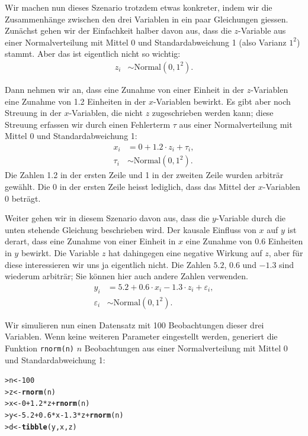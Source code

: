 \documentclass[oneside, 10pt]{book}\usepackage[]{graphicx}\usepackage[]{xcolor}
\makeatletter
\newcommand{\hlnum}[1]{\textcolor[rgb]{0.686,0.059,0.569}{#1}}%
\newcommand{\hlopt}[1]{\textcolor[rgb]{0,0,0}{#1}}%
\newcommand{\hlstd}[1]{\textcolor[rgb]{0.345,0.345,0.345}{#1}}%
\newcommand{\hlkwb}[1]{\textcolor[rgb]{0.69,0.353,0.396}{#1}}%
\newcommand{\hlkwd}[1]{\textcolor[rgb]{0.737,0.353,0.396}{\textbf{#1}}}%
\newenvironment{kframe}{%
 \def\at@end@of@kframe{}%
 \ifinner\ifhmode%
  \def\at@end@of@kframe{\end{minipage}}%
  \begin{minipage}{\columnwidth}%
 \fi\fi%
 \def\FrameCommand##1{\hskip\@totalleftmargin \hskip-\fboxsep
 \colorbox{shadecolor}{##1}\hskip-\fboxsep
     \hskip-\linewidth \hskip-\@totalleftmargin \hskip\columnwidth}%
 \MakeFramed {\advance\hsize-\width
   \@totalleftmargin\z@ \linewidth\hsize
   \@setminipage}}%
 {\par\unskip\endMakeFramed%
 \at@end@of@kframe}
\newenvironment{knitrout}{}{} %
\makeatother
\begin{document}
Wir machen nun dieses Szenario trotzdem etwas konkreter,
indem wir die Zusammenhänge zwischen den drei Variablen
in ein paar Gleichungen giessen.
Zunächst gehen wir der Einfachkeit halber davon aus,
dass die $z$-Variable aus einer Normalverteilung mit Mittel
0 und Standardabweichung 1 (also Varianz $1^2$) stammt.
Aber das ist eigentlich nicht so wichtig:
\begin{align}
z_i &\sim \textrm{Normal}(0, 1^2). \nonumber
\end{align}

Dann nehmen wir an, dass eine Zunahme von einer Einheit in der $z$-Variablen
eine Zunahme von 1.2 Einheiten in der $x$-Variablen bewirkt.
Es gibt aber noch Streuung in der $x$-Variablen, die nicht $z$ zugeschrieben
werden kann; diese Streuung erfassen wir durch einen Fehlerterm $\tau$
aus einer Normalverteilung mit Mittel 0 und Standardabweichung 1:
\begin{align}
x_i &= 0 + 1.2\cdot z_i + \tau_i, \label{eq:dag1_x} \\
\tau_i &\sim \textrm{Normal}(0, 1^2). \nonumber
\end{align}
Die Zahlen 1.2 in der ersten Zeile und 1 in der zweiten Zeile
wurden arbiträr gewählt. Die 0 in der ersten Zeile heisst lediglich,
dass das Mittel der $x$-Variablen 0 beträgt.

Weiter gehen wir in diesem Szenario davon aus,
dass die $y$-Variable durch die unten stehende Gleichung beschrieben wird.
Der kausale Einfluss von $x$ auf $y$ ist derart,
dass eine Zunahme von einer Einheit in $x$ eine Zunahme von 0.6 Einheiten
in $y$ bewirkt. Die Variable $z$ hat dahingegen eine negative Wirkung
auf $z$, aber für diese interessieren wir uns ja eigentlich nicht.
Die Zahlen $5.2$, $0.6$ und $-1.3$ sind wiederum arbiträr; Sie können hier auch
andere Zahlen verwenden.
\begin{align}
y_i &= 5.2 + 0.6\cdot x_i - 1.3 \cdot z_i + \varepsilon_i, \label{eq:dag1} \\
\varepsilon_i &\sim \textrm{Normal}(0, 1^2). \nonumber
\end{align}

Wir simulieren nun einen Datensatz mit 100 Beobachtungen dieser
drei Variablen. Wenn keine weiteren Parameter eingestellt werden,
generiert die Funktion \texttt{rnorm(n)} $n$ Beobachtungen aus einer
Normalverteilung mit Mittel 0 und Standardabweichung 1:
\begin{knitrout}
\color{fgcolor}\begin{kframe}
\begin{alltt}
\hlstd{> }\hlstd{n} \hlkwb{<-} \hlnum{100}
\hlstd{> }\hlstd{z} \hlkwb{<-} \hlkwd{rnorm}\hlstd{(n)}
\hlstd{> }\hlstd{x} \hlkwb{<-} \hlnum{0} \hlopt{+} \hlnum{1.2}\hlopt{*}\hlstd{z} \hlopt{+} \hlkwd{rnorm}\hlstd{(n)}
\hlstd{> }\hlstd{y} \hlkwb{<-} \hlnum{5.2} \hlopt{+} \hlnum{0.6}\hlopt{*}\hlstd{x} \hlopt{-} \hlnum{1.3}\hlopt{*}\hlstd{z} \hlopt{+} \hlkwd{rnorm}\hlstd{(n)}
\hlstd{> }\hlstd{d} \hlkwb{<-} \hlkwd{tibble}\hlstd{(y, x, z)}
\end{alltt}
\end{kframe}
\end{knitrout}
\end{document}
